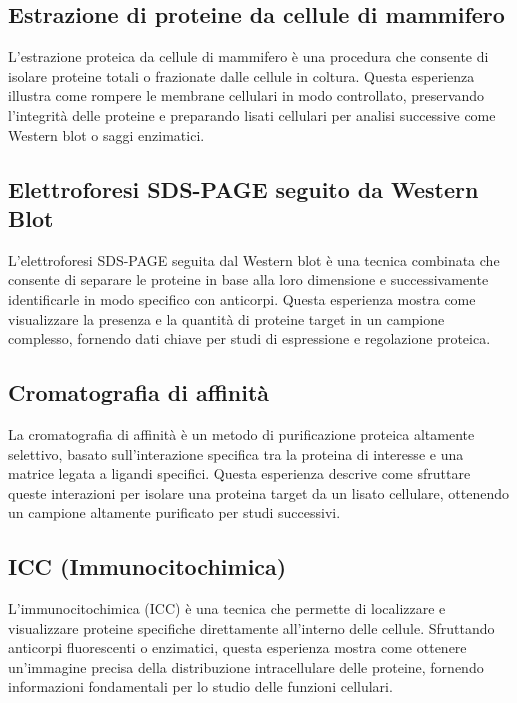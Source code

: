 \subsection{Estrazione di proteine da cellule di mammifero}
L’estrazione proteica da cellule di mammifero è una procedura che consente di isolare proteine totali o frazionate dalle cellule in coltura. Questa esperienza illustra come rompere le membrane cellulari in modo controllato, preservando l’integrità delle proteine e preparando lisati cellulari per analisi successive come Western blot o saggi enzimatici.

\subsection{Elettroforesi SDS-PAGE seguito da Western Blot}
L’elettroforesi SDS-PAGE seguita dal Western blot è una tecnica combinata che consente di separare le proteine in base alla loro dimensione e successivamente identificarle in modo specifico con anticorpi. Questa esperienza mostra come visualizzare la presenza e la quantità di proteine target in un campione complesso, fornendo dati chiave per studi di espressione e regolazione proteica.

\subsection{Cromatografia di affinità}
La cromatografia di affinità è un metodo di purificazione proteica altamente selettivo, basato sull’interazione specifica tra la proteina di interesse e una matrice legata a ligandi specifici. Questa esperienza descrive come sfruttare queste interazioni per isolare una proteina target da un lisato cellulare, ottenendo un campione altamente purificato per studi successivi.

\subsection{ICC (Immunocitochimica)}
L’immunocitochimica (ICC) è una tecnica che permette di localizzare e visualizzare proteine specifiche direttamente all’interno delle cellule. Sfruttando anticorpi fluorescenti o enzimatici, questa esperienza mostra come ottenere un’immagine precisa della distribuzione intracellulare delle proteine, fornendo informazioni fondamentali per lo studio delle funzioni cellulari.
